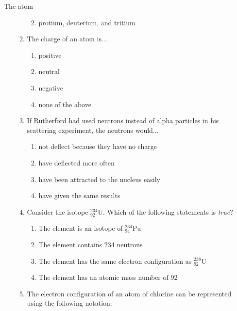\begin{eocexercises}{The atom}
\begin{enumerate}[noitemsep, label=\textbf{\arabic*}. ]
\begin{enumerate}[noitemsep, label=\textbf{\alph*}. ]
\begin{enumerate}[noitemsep, label=\textbf{\roman*}. ]
\label{m38741*uid202}\item protium, deuterium, and tritium
\end{enumerate}
                \label{m38741*uid203}\item The charge of an atom is...
\label{m38741*id263355}\begin{enumerate}[noitemsep, label=\textbf{\roman*}. ] 
            \label{m38741*uid204}\item positive
\label{m38741*uid205}\item neutral
\label{m38741*uid206}\item negative
\item none of the above
\end{enumerate}
                \label{m38741*uid207}\item If Rutherford had used neutrons instead of alpha particles in his scattering experiment, the neutrons would...
\label{m38741*id263410}\begin{enumerate}[noitemsep, label=\textbf{\roman*}. ] 
            \label{m38741*uid208}\item not deflect because they have no charge
\label{m38741*uid209}\item have deflected more often
\label{m38741*uid210}\item have been attracted to the nucleus easily
\label{m38741*uid211}\item have given the same results
\end{enumerate}
                \label{m38741*uid212}\item Consider the isotope $_{92}^{234}\text{U}$. Which of the following statements is \textsl{true}?
\label{m38741*id263500}\begin{enumerate}[noitemsep, label=\textbf{\roman*}. ] 
            \label{m38741*uid213}\item The element is an isotope of $_{94}^{234}\text{Pu}$
\label{m38741*uid214}\item The element contains 234 neutrons
\label{m38741*uid215}\item The element has the same electron configuration as $_{92}^{238}\text{U}$
\label{m38741*uid216}\item The element has an atomic mass number of 92
\end{enumerate}
                \label{m38741*uid217}\item The electron configuration of an atom of chlorine can be represented using the following notation:
\label{m38741*id263598}\begin{enumerate}[noitemsep, label=\textbf{\roman*}. ] 

\end{enumerate}
\end{enumerate}
\end{enumerate}
\end{eocexercises}
